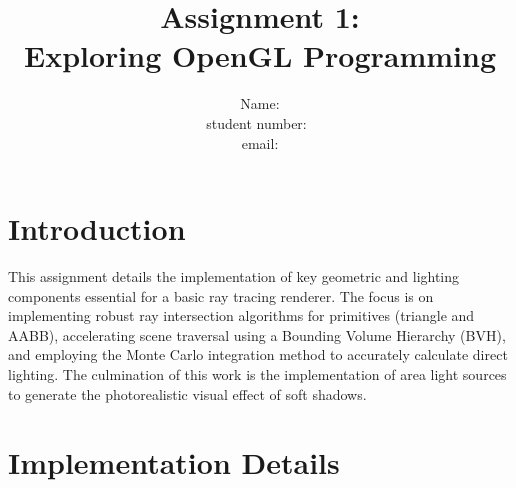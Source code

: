 \documentclass[acmtog]{acmart}
\title{Assignment 1:\\ {Exploring OpenGL Programming}}
\author{Name: \quad \\ student number:\
\\email: \quad \texttt{}}
\begin{document}
\maketitle

\vspace*{2 ex}

\section{Introduction}
This assignment details the implementation of key geometric and lighting components essential for a basic ray tracing renderer. The focus is on implementing robust ray intersection algorithms for primitives (triangle and AABB), accelerating scene traversal using a Bounding Volume Hierarchy (BVH), and employing the Monte Carlo integration method to accurately calculate direct lighting. The culmination of this work is the implementation of area light sources to generate the photorealistic visual effect of soft shadows.
\section{Implementation Details}
\end{document}
